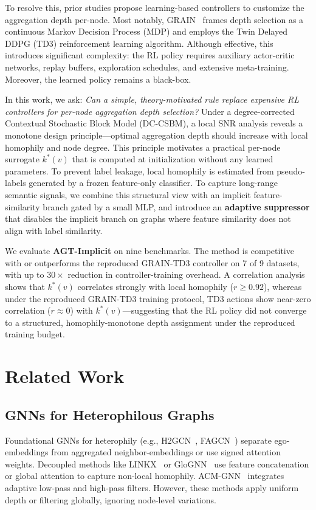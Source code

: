 \documentclass[letterpaper]{article}
\newcommand{\methodname}{\textbf{AGT-Implicit}}
\begin{document}
To resolve this, prior studies propose learning-based controllers to customize the aggregation depth per-node. Most notably, GRAIN~\cite{grain2025} frames depth selection as a continuous Markov Decision Process (MDP) and employs the Twin Delayed DDPG (TD3) reinforcement learning algorithm. Although effective, this introduces significant complexity: the RL policy requires auxiliary actor-critic networks, replay buffers, exploration schedules, and extensive meta-training. Moreover, the learned policy remains a black-box.

In this work, we ask: \emph{Can a simple, theory-motivated rule replace expensive RL controllers for per-node aggregation depth selection?} Under a degree-corrected Contextual Stochastic Block Model (DC-CSBM), a local SNR analysis reveals a monotone design principle---optimal aggregation depth should increase with local homophily and node degree. This principle motivates a practical per-node surrogate $k^*(v)$ that is computed at initialization without any learned parameters. To prevent label leakage, local homophily is estimated from pseudo-labels generated by a frozen feature-only classifier. To capture long-range semantic signals, we combine this structural view with an implicit feature-similarity branch gated by a small MLP, and introduce an \textbf{adaptive suppressor} that disables the implicit branch on graphs where feature similarity does not align with label similarity.

We evaluate \methodname{} on nine benchmarks. The method is competitive with or outperforms the reproduced GRAIN-TD3 controller on 7 of 9 datasets, with up to $30\times$ reduction in controller-training overhead. A correlation analysis shows that $k^*(v)$ correlates strongly with local homophily ($r \ge 0.92$), whereas under the reproduced GRAIN-TD3 training protocol, TD3 actions show near-zero correlation ($r \approx 0$) with $k^*(v)$---suggesting that the RL policy did not converge to a structured, homophily-monotone depth assignment under the reproduced training budget.

\section{Related Work}
\label{sec:related}

\subsection{GNNs for Heterophilous Graphs}
Foundational GNNs for heterophily (e.g., H2GCN~\cite{h2gcn2020}, FAGCN~\cite{fagcn2021}) separate ego-embeddings from aggregated neighbor-embeddings or use signed attention weights. Decoupled methods like LINKX~\cite{linkx2021} or GloGNN~\cite{glognn2022} use feature concatenation or global attention to capture non-local homophily. ACM-GNN~\cite{acmgnn2022} integrates adaptive low-pass and high-pass filters. However, these methods apply uniform depth or filtering globally, ignoring node-level variations.
\end{document}

